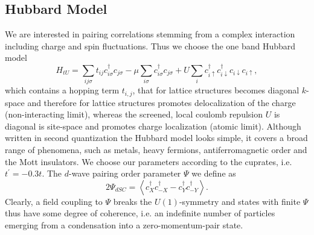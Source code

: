 \documentclass[aps,prb,twocolumn,groupedaddress,amsmath,amssymb]{revtex4-1}
\newcommand{\up}{\uparrow}
\newcommand{\dn}{\downarrow}
\begin{document}
\subsection{Hubbard Model}
We are interested in pairing correlations stemming from a complex interaction including charge and spin fluctuations. Thus we choose the one band Hubbard model \cite{Hubbard1963}
\begin{equation}
  \label{eq:hubbard}
  H_{tU}=\sum_{ij\sigma}t_{ij}c^{\dagger}_{i\sigma}c_{j\sigma}-\mu\sum_{i\sigma}c^{\dagger}_{i\sigma}c_{j\sigma}+U\sum_ic^{\dagger}_{i\up}c^{\dagger}_{i\dn}c_{i\dn}c_{i\up},
\end{equation}
which contains a hopping term $t_{i,j}$, that for lattice structures becomes diagonal $k$-space and therefore for lattice structures promotes delocalization of the charge (non-interacting limit), whereas the screened, local coulomb repulsion $U$ is diagonal is site-space and promotes charge localization (atomic limit). Although written in second quantization the Hubbard model looks simple, it covers a broad range of phenomena, such as metals, heavy fermions, antiferromagnetic order and the Mott insulators. We choose our parameters according to the cuprates, i.e. $t^\prime= -0.3t$.
The $d$-wave pairing order parameter $\Psi$ we define as
\begin{equation}
  \label{eq:dwaveop}
  2\Psi_{dSC} = \left< c^\dagger_X c^\dagger_{-X} - c^\dagger_Y c^\dagger_{-Y}\right>.
\end{equation}
Clearly, a field coupling to $\Psi$ breaks the $U(1)$-symmetry and states with finite $\Psi$ thus have some degree of coherence, i.e. an indefinite number of particles emerging from a condensation into a zero-momentum-pair state.\cite{AlexanderAltland2010,HenrikBruus2004}
\end{document}
